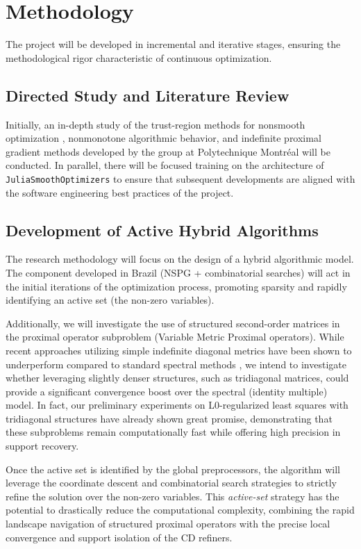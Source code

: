 \section{Methodology}

The project will be developed in incremental and iterative stages, ensuring the methodological rigor characteristic of continuous optimization.

\subsection{Directed Study and Literature Review}
Initially, an in-depth study of the trust-region methods for nonsmooth optimization \cite{leconte2023complexity}, nonmonotone algorithmic behavior, and indefinite proximal gradient methods \cite{Leconte_2024} developed by the group at Polytechnique Montréal will be conducted. In parallel, there will be focused training on the architecture of \texttt{JuliaSmoothOptimizers} to ensure that subsequent developments are aligned with the software engineering best practices of the project.

\subsection{Development of Active Hybrid Algorithms}
The research methodology will focus on the design of a hybrid algorithmic model. The component developed in Brazil (NSPG + combinatorial searches) will act in the initial iterations of the optimization process, promoting sparsity and rapidly identifying an active set (the non-zero variables).

Additionally, we will investigate the use of structured second-order matrices in the proximal operator subproblem (Variable Metric Proximal operators). While recent approaches utilizing simple indefinite diagonal metrics have been shown to underperform compared to standard spectral methods \cite{Leconte_2024}, we intend to investigate whether leveraging slightly denser structures, such as tridiagonal matrices, could provide a significant convergence boost over the spectral (identity multiple) model. In fact, our preliminary experiments on L0-regularized least squares with tridiagonal structures have already shown great promise, demonstrating that these subproblems remain computationally fast while offering high precision in support recovery.

Once the active set is identified by the global preprocessors, the algorithm will leverage the coordinate descent and combinatorial search strategies to strictly refine the solution over the non-zero variables. This \textit{active-set} strategy has the potential to drastically reduce the computational complexity, combining the rapid landscape navigation of structured proximal operators with the precise local convergence and support isolation of the CD refiners.

